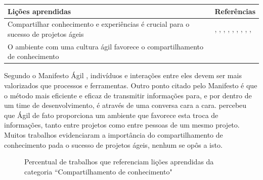 \begin{table}[H]
	\centering
	\begin{tabularx}{\linewidth}{ | X | p{5cm} | } \hline \textbf{Lições aprendidas} & \textbf{Referências} \\ \hline
		Compartilhar conhecimento e experiências é crucial para o sucesso de projetos ágeis & \cite{Asnawi2012}, \cite{Cisco2011}, \cite{Lapham2012}, \cite{Radha2012}, \cite{Eunha2012}, \cite{Valerio2013}, \cite{Vieira2013}, \cite{Queiroz2013}, \cite{Bastos2013}, \cite{Maciel2013} \\ \hline
		O ambiente com uma cultura ágil favorece o compartilhamento de conhecimento & \cite{Ericsson2013} \\ \hline
	\end{tabularx}
\end{table}

Segundo o Manifesto Ágil \cite{agileManifesto}, indivíduos e interações entre eles devem ser mais valorizados que processos e ferramentas. Outro ponto citado pelo Manifesto é que o método mais eficiente e eficaz de transmitir informações para, e por dentro de um time de desenvolvimento, é através de uma conversa cara a cara. \cite{Ericsson2013} percebeu que Ágil de fato proporciona um ambiente que favorece esta troca de informações, tanto entre projetos como entre pessoas de um mesmo projeto. Muitos trabalhos evidenciaram a importância do compartilhamento de conhecimento pada o sucesso de projetos ágeis, nenhum se opôs a isto.

\begin{figure}[H]
	\centering
	\captionsetup{justification=centering}
	\caption{Percentual de trabalhos que referenciam lições aprendidas da categoria ``Compartilhamento de conhecimento"}
	\label{fig:conhecimento}
\end{figure}

